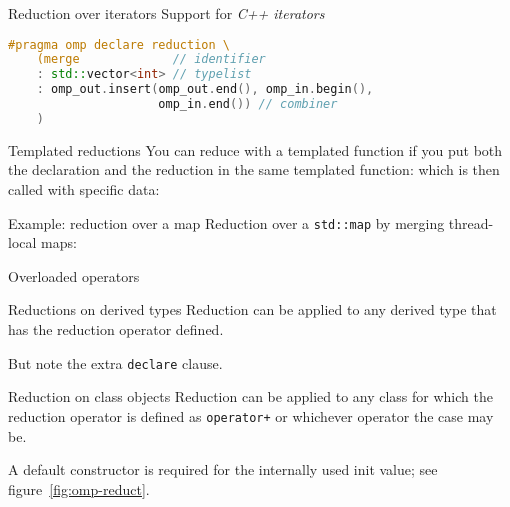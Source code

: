 \begin{cppnote}{Reduction over iterators}
  Support for
  \emph{C++ iterators}
\begin{lstlisting}[language=C++]
#pragma omp declare reduction \
    (merge             // identifier 
    : std::vector<int> // typelist
    : omp_out.insert(omp_out.end(), omp_in.begin(), 
                     omp_in.end()) // combiner
    ) 
\end{lstlisting}
\end{cppnote}

\begin{cppnote}{Templated reductions}
  You can reduce with a templated function
  if you put both the declaration and the reduction
  in the same templated function:
  which is then called with specific data:
\end{cppnote}

\begin{cppnote}{Example: reduction over a map}
  Reduction over a \lstinline{std::map}
  by merging thread-local maps:
  \begin{multicols}{2}
    \columnbreak
  \end{multicols}
\end{cppnote}

\Level 1 {Overloaded operators}

\begin{fortrannote}{Reductions on derived types}
  Reduction can be applied to any derived type that has the
  reduction operator defined.
  \begin{multicols}{2}
    \fverbatimsnippet{ftypeopdef}
    \columnbreak
    \fverbatimsnippet{ftypeopuse}
  \end{multicols}
  But note the extra \lstinline{declare} clause.  
\end{fortrannote}

\begin{cppnote}{Reduction on class objects}
  Reduction can be applied to any class for which the
  reduction operator is defined as \lstinline{operator+}
  or whichever operator the case may be.
  \begin{multicols}{2}
    \let\snippetoutputsize\footnotesize
    \columnbreak
  \end{multicols}
  A default constructor is required for the
  internally used init value;
  see figure~\ref{fig:omp-reduct}.
\end{cppnote}


